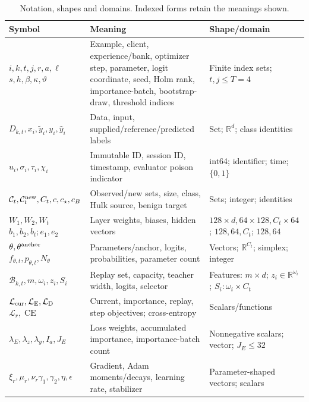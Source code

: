 \documentclass[10pt,a4paper]{article}
\newcommand{\CE}{\operatorname{CE}}
\begin{document}
\begin{table}[htbp]
\centering\scriptsize
\caption{Notation, shapes and domains. Indexed forms retain the meanings shown.}
\label{tab:notation}
\begin{tabularx}{\linewidth}{L{3.3cm}Y L{4.4cm}}
\toprule
Symbol & Meaning & Shape/domain\\
\midrule
$i,k,t,j,r,a,\ell$\newline $s,h,\beta,\kappa,\vartheta$ & Example, client, experience/bank, optimizer step, parameter, logit coordinate, seed, Holm rank, importance-batch, bootstrap-draw, threshold indices & Finite index sets; $t,j\le T=4$\\
$D_{k,t},x_i,\widetilde y_i,y_i,\widehat y_i$ & Data, input, supplied/reference/predicted labels & Set; $\mathbb R^d$; class identities\\
$u_i,\sigma_i,\tau_i,\chi_i$ & Immutable ID, session ID, timestamp, evaluator poison indicator & int64; identifier; time; $\{0,1\}$\\
$\mathcal C_t,\mathcal C_t^{\rm new},C_t,c,c_\star,c_B$ & Observed/new sets, size, class, Hulk source, benign target & Sets; integer; identities\\
$W_1,W_2,W_t$\newline $b_1,b_2,b_t;e_1,e_2$ & Layer weights, biases, hidden vectors & $128\!\times\!d,64\!\times\!128,C_t\!\times\!64$; $128,64,C_t$; $128,64$\\
$\theta,\theta^{\rm anchor}$\newline $f_{\theta,t},p_{\theta,t},N_\theta$ & Parameters/anchor, logits, probabilities, parameter count & Vectors; $\mathbb R^{C_t}$; simplex; integer\\
$\mathcal B_{k,t},m,\omega_i,z_i,S_i$ & Replay set, capacity, teacher width, logits, selector & Features: $m\!\times\!d$; $z_i\in\mathbb R^{\omega_i}$; $S_i:\omega_i\!\times\!C_t$\\
$\mathcal L_{\rm cur},\mathcal L_{\rm E},\mathcal L_{\rm D}$\newline $\mathcal L_r,\CE$ & Current, importance, replay, step objectives; cross-entropy & Scalars/functions\\
$\lambda_E,\lambda_z,\lambda_y,I_a,J_E$ & Loss weights, accumulated importance, importance-batch count & Nonnegative scalars; vector; $J_E\le32$\\
$\xi_r,\mu_r,\nu_r$\newline $\gamma_1,\gamma_2,\eta,\epsilon$ & Gradient, Adam moments/decays, learning rate, stabilizer & Parameter-shaped vectors; scalars\\

\end{tabularx}
\end{table}
\end{document}
